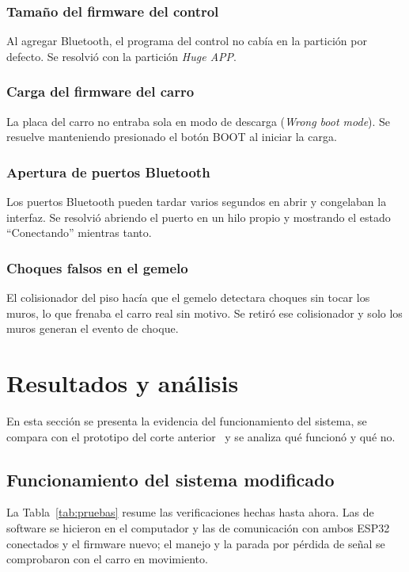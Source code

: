 \documentclass[journal]{IEEEtran}
\begin{document}
\subsubsection{Tamaño del firmware del control}
Al agregar Bluetooth, el programa del control no cabía en la partición por defecto. Se resolvió con la partición \emph{Huge APP}.

\subsubsection{Carga del firmware del carro}
La placa del carro no entraba sola en modo de descarga (\emph{Wrong boot mode}). Se resuelve manteniendo presionado el botón BOOT al iniciar la carga.

\subsubsection{Apertura de puertos Bluetooth}
Los puertos Bluetooth pueden tardar varios segundos en abrir y congelaban la interfaz. Se resolvió abriendo el puerto en un hilo propio y mostrando el estado ``Conectando'' mientras tanto.

\subsubsection{Choques falsos en el gemelo}
El colisionador del piso hacía que el gemelo detectara choques sin tocar los muros, lo que frenaba el carro real sin motivo. Se retiró ese colisionador y solo los muros generan el evento de choque.

\section{Resultados y análisis}
En esta sección se presenta la evidencia del funcionamiento del sistema, se compara con el prototipo del corte anterior~\cite{corte2} y se analiza qué funcionó y qué no.

\subsection{Funcionamiento del sistema modificado}
La Tabla~\ref{tab:pruebas} resume las verificaciones hechas hasta ahora. Las de software se hicieron en el computador y las de comunicación con ambos ESP32 conectados y el firmware nuevo; el manejo y la parada por pérdida de señal se comprobaron con el carro en movimiento.
\end{document}
